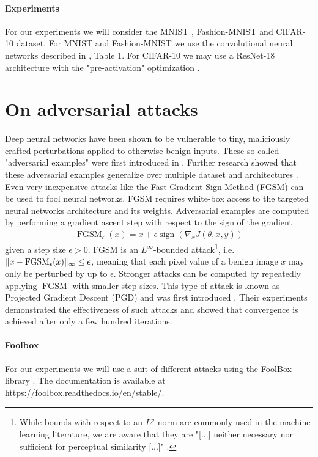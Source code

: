 \documentclass{article}
\begin{document}
\paragraph{Experiments}
For our experiments we will consider the MNIST \cite{deng2012mnist}, Fashion-MNIST \cite{xiao2017fashion} and CIFAR-10 \cite{krizhevsky2009learning} dataset. For MNIST and Fashion-MNIST we use the convolutional neural networks described in \cite{carlini2017towards}, Table 1. For CIFAR-10 we may use a ResNet-18 architecture \cite{he2016deep} with the "pre-activation" optimization \cite{he2016identity}. 

	
\section{On adversarial attacks}
Deep neural networks have been shown to be vulnerable to tiny, maliciously crafted perturbations applied to otherwise benign inputs. These so-called "adversarial examples" were first introduced in \cite{Szegedy13}. Further research showed that these adversarial examples generalize over multiple dataset and architectures \cite{goodfellow2014explaining}. Even very inexpensive attacks like the Fast Gradient Sign Method (FGSM) \cite{goodfellow2014explaining} can be used to fool neural networks. FGSM requires white-box access to the targeted neural networks architecture and its weights. Adversarial examples are computed by performing a gradient ascent step with respect to the sign of the gradient
\begin{align*}
	\operatorname{FGSM}_\epsilon(x) = x + \epsilon\operatorname{sign}(\nabla_x J(\theta,x,y)) 
\end{align*}
given a step size $\epsilon>0$. FGSM is an $L^\infty$-bounded attack\footnote{While bounds with respect to an $L^p$ norm are commonly used in the machine learning literature, we are aware that they are "[...] neither necessary nor sufficient for perceptual similarity [...]" \cite{sharif2018suitability}.}, i.e. $\lVert x-\operatorname{FGSM}_\epsilon(x)\rVert_\infty\le\epsilon$, meaning that each pixel value of a benign image $x$ may only be perturbed by up to $\epsilon$.
Stronger attacks can be computed by repeatedly applying $\operatorname{FGSM}$ with smaller step sizes. This type of attack is known as Projected Gradient Descent (PGD) and was first introduced \cite{madry2017towards}. Their experiments demonstrated the effectiveness of such attacks and showed that convergence is achieved after only a few hundred iterations. 

\paragraph{Foolbox}
For our experiments we will use a suit of different attacks using the FoolBox library \cite{rauber2017foolbox}. The documentation is available at \url{https://foolbox.readthedocs.io/en/stable/}. 



\end{document}
